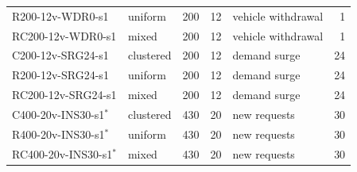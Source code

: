 \begin{tabular}{llrrlr}
\textsf{R200-12v-WDR0-s1} & uniform & 200 & 12 & vehicle withdrawal & 1 \\
\textsf{RC200-12v-WDR0-s1} & mixed & 200 & 12 & vehicle withdrawal & 1 \\
\textsf{C200-12v-SRG24-s1} & clustered & 200 & 12 & demand surge & 24 \\
\textsf{R200-12v-SRG24-s1} & uniform & 200 & 12 & demand surge & 24 \\
\textsf{RC200-12v-SRG24-s1} & mixed & 200 & 12 & demand surge & 24 \\
\textsf{C400-20v-INS30-s1}$^{\ast}$ & clustered & 430 & 20 & new requests & 30 \\
\textsf{R400-20v-INS30-s1}$^{\ast}$ & uniform & 430 & 20 & new requests & 30 \\
\textsf{RC400-20v-INS30-s1}$^{\ast}$ & mixed & 430 & 20 & new requests & 30 \\
\bottomrule
\end{tabular}
